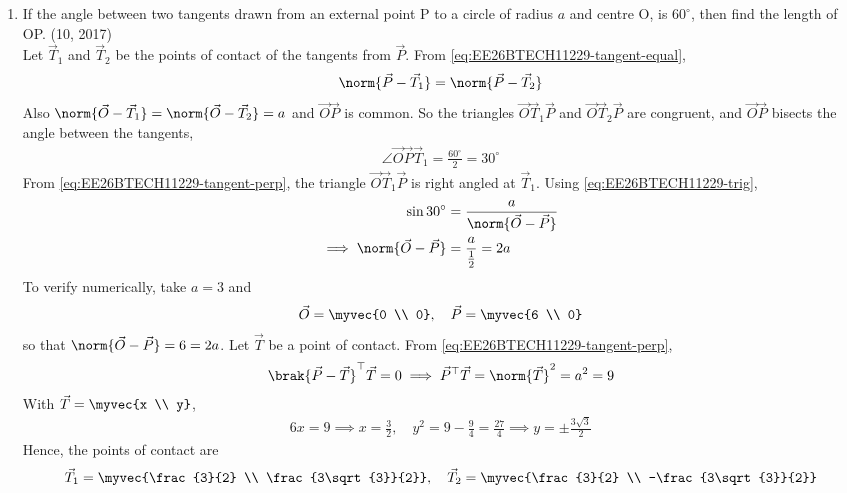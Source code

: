 \begin{enumerate}[label=\thesubsection.\arabic*, ref=\thesubsection.\theenumi]
\item 
If the angle between two tangents drawn from an external point P to a circle of radius $a$ and centre O, is $60^{\circ}$, then find the length of OP.
\hfill (10, 2017)
\\
\solution
Let $\vec{T}_1$ and $\vec{T}_2$ be the points of contact of the tangents from $\vec{P}$. From \eqref{eq:EE26BTECH11229-tangent-equal},
\begin{align}
	\norm{\vec{P}-\vec{T}_1} = \norm{\vec{P}-\vec{T}_2}
\end{align}
Also $\norm{\vec{O}-\vec{T}_1} = \norm{\vec{O}-\vec{T}_2} = a$ and $\vec{O}\vec{P}$ is common. So the triangles $\vec{O}\vec{T}_1\vec{P}$ and $\vec{O}\vec{T}_2\vec{P}$ are congruent, and $\vec{O}\vec{P}$ bisects the angle between the tangents,
\begin{align}
	\angle \vec{O}\vec{P}\vec{T}_1 = \frac{60^{\circ}}{2} = 30^{\circ}
\end{align}
From \eqref{eq:EE26BTECH11229-tangent-perp}, the triangle $\vec{O}\vec{T}_1\vec{P}$ is right angled at $\vec{T}_1$. Using \eqref{eq:EE26BTECH11229-trig},
\begin{align}
	\sin 30^{\circ} &= \frac{a}{\norm{\vec{O}-\vec{P}}}
	\\
	\implies \norm{\vec{O}-\vec{P}} &= \frac{a}{\frac{1}{2}} = 2a
\end{align}
To verify numerically, take $a = 3$ and
\begin{align}
	\vec{O} = \myvec{0 \\ 0}, \quad \vec{P} = \myvec{6 \\ 0}
\end{align}
so that $\norm{\vec{O}-\vec{P}} = 6 = 2a$. Let $\vec{T}$ be a point of contact. From \eqref{eq:EE26BTECH11229-tangent-perp},
\begin{align}
	\brak{\vec{P}-\vec{T}}^{\top}\vec{T} = 0 \implies \vec{P}^{\top}\vec{T} = \norm{\vec{T}}^2 = a^2 = 9
\end{align}
With $\vec{T} = \myvec{x \\ y}$,
\begin{align}
	6x = 9 \implies x = \frac{3}{2}, \quad y^2 = 9 - \frac{9}{4} = \frac{27}{4} \implies y = \pm\frac{3\sqrt{3}}{2}
\end{align}
Hence, the points of contact are
\begin{align}
	\vec{T}_1 = \myvec{\frac{3}{2} \\ \frac{3\sqrt{3}}{2}}, \quad \vec{T}_2 = \myvec{\frac{3}{2} \\ -\frac{3\sqrt{3}}{2}}

\end{align}
\end{enumerate}
